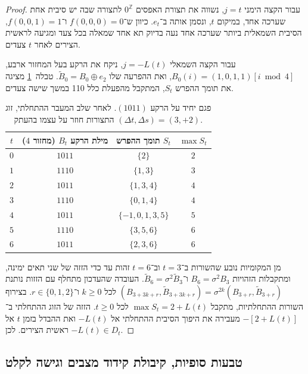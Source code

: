 \documentclass[11pt,a4paper]{article}
\theoremstyle{definition}
\begin{document}
\begin{proof}
עבור הקצה הימני $j = t$, נשווה את תצורת האפסים $0^{\mathbb{Z}}$ לתצורה שבה יש סיבית אחת שערכה אחד, במיקום $t$, ונסמן אותה ב־$e_t$. כיוון ש־$f(0, 0, 0) = 0$ ו־$f(0, 0, 1) = 1$, הסיבית השמאלית ביותר שערכה אחד נעה בדיוק תא אחד שמאלה בכל צעד ומגיעה לראשית הצירים לאחר $t$ צעדים.

עבור הקצה השמאלי $j = -L(t)$, ניקח את הרקע בעל המחזור ארבע, $B_0(i) = (1, 0, 1, 1)[i \bmod 4]$, ואת ההפרעה שלו $\widetilde B_0 = B_0 \oplus e_2$. טבלה~\ref{tab:period4_defect} מציגה את תומך ההפרש $S_t$, המתקבל מהפעלת כלל 110 במשך שישה צעדים.

\begin{table}[h]
\centering
\caption{פגם יחיד על הרקע $(1011)$. לאחר שלב המעבר ההתחלתי, זוג התצורות חוזר על עצמו בהעתק $(\Delta t, \Delta s) = (3, +2)$.}
\label{tab:period4_defect}
\begin{tabular}{cccc}
\toprule
$t$ & מילת הרקע $B_t$ (מחזור $4$) & תומך ההפרש $S_t$ & $\max S_t$ \\
\midrule
$0$ & $1011$ & $\{2\}$ & $2$ \\
$1$ & $1110$ & $\{1, 3\}$ & $3$ \\
$2$ & $1011$ & $\{1, 3, 4\}$ & $4$ \\
$3$ & $1110$ & $\{0, 1, 4\}$ & $4$ \\
$4$ & $1011$ & $\{-1, 0, 1, 3, 5\}$ & $5$ \\
$5$ & $1110$ & $\{3, 5, 6\}$ & $6$ \\
$6$ & $1011$ & $\{2, 3, 6\}$ & $6$ \\
\bottomrule
\end{tabular}
\end{table}

מן המקומיות נובע שהשורות ב־$t=3$ וב־$t=6$ זהות עד כדי הזזה של שני תאים ימינה, ומתקבלות הזהויות $B_6 = \sigma^2 B_3$ ו־$\widetilde B_6 = \sigma^2 \widetilde B_3$. העובדה שהעדכון מתחלף עם הזזות נותנת $(B_{3+3k+r}, \widetilde B_{3+3k+r}) = \sigma^{2k}(B_{3+r}, \widetilde B_{3+r})$ לכל $k \ge 0$ ו־$r \in \{0, 1, 2\}$. בצירוף השורות ההתחלתיות, מתקבל $\max S_t = 2 + L(t)$ לכל $t \ge 0$. הזזה של הזוג ההתחלתי ב־$-[2 + L(t)]$ מעבירה את היפוך הסיבית ההתחלתי אל $-L(t)$ ואת ההבדל בזמן $t$ אל ראשית הצירים. לכן $-L(t) \in D_t$.
\end{proof}

\subsection{טבעות סופיות, קיבולת קידוד מצבים וגישה לקלט}
\end{document}
